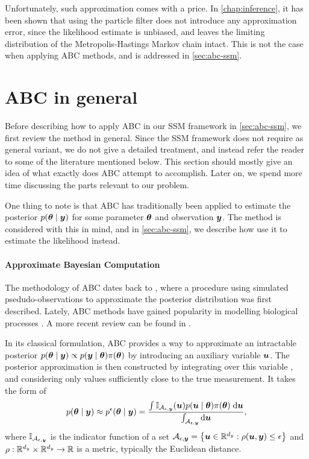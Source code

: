 Unfortunately, such approximation comes with a price. In \autoref{chap:inference}, it has been shown that using the particle filter does not introduce any approximation error, since the likelihood estimate is unbiased, and leaves the limiting distribution of the Metropolis-Hastings Markov chain intact. This is not the case when applying ABC methods, and is addressed in \autoref{sec:abc-ssm}.


\section{ABC in general} \label{sec:abc-general}
Before describing how to apply ABC in our SSM framework in \autoref{sec:abc-ssm}, we first review the method in general. Since the SSM framework does not require as general variant, we do not give a detailed treatment, and instead refer the reader to some of the literature mentioned below. This section should mostly give an idea of what exactly does ABC attempt to accomplish. Later on, we spend more time discussing the parts relevant to our problem.

One thing to note is that ABC has traditionally been applied to estimate the posterior $p(\bm{\theta} \mid \bm{y})$ for some parameter $\bm{\theta}$ and observation $\bm{y}$. The method is considered with this in mind, and in \autoref{sec:abc-ssm}, we describe how use it to estimate the likelihood instead.

\paragraph{Approximate Bayesian Computation}
The methodology of ABC dates back to \cite{abc-old-old}, where a procedure using simulated psedudo-observations to approximate the posterior distribution was first described. Lately, ABC methods have gained popularity in modelling biological processes \citep{abc-old}. A more recent review can be found in \cite{abc-recent}.

In its classical formulation, ABC provides a way to approximate an intractable posterior ${p(\bm{\theta} \mid \bm{y}) \propto p(\bm{y} \mid \bm{\theta}) \pi(\bm{\theta})}$ by introducing an auxiliary variable $\bm{u}$. The posterior approximation is then constructed by integrating over this variable \citep{jasra-filtering}, and considering only values sufficiently close to the true measurement. It takes the form of
\begin{equation} \label{eq:abc-integral}
p(\bm{\theta} \mid \bm{y}) \approx p^\epsilon(\bm{\theta} \mid \bm{y}) = \frac{\int \mathbb{I}_{\mathcal{A}_{\epsilon, \bm{y}}}(\bm{u}) p(\bm{u} \mid \bm{\theta}) \pi(\bm{\theta}) \; \mathrm{d}{\bm{u}}}{\int_{\mathcal{A}_{\epsilon, \bm{y}}} \mathrm{d}{\bm{u}}},
\end{equation}
where $\mathbb{I}_{\mathcal{A}_{\epsilon, \bm{y}}}$ is the indicator function of a set $\mathcal{A}_{\epsilon, \bm{y}} = \left\{\bm{u} \in \mathbb{R}^{d_y} : \rho(\bm{u}, \bm{y}) \leq \epsilon \right\}$ and ${\rho: \mathbb{R}^{d_y} \times \mathbb{R}^{d_y} \to \mathbb{R}}$ is a metric, typically the Euclidean distance.

